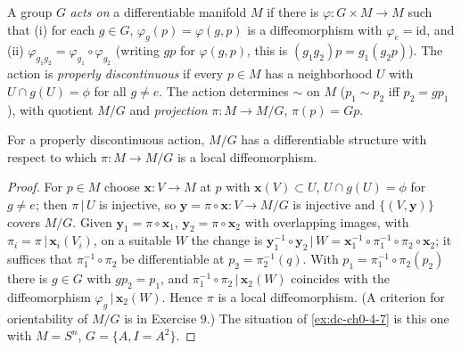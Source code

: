 \begin{example}
  \label{ex:dc-ch0-4-8}
  \notready
  A group $G$ \emph{acts on} a differentiable manifold $M$ if there is
  $\varphi:G\times M\to M$ such that (i) for each $g\in G$, $\varphi_g(p)=\varphi(g,p)$
  is a diffeomorphism with $\varphi_e=\mathrm{id}$, and (ii)
  $\varphi_{g_1 g_2}=\varphi_{g_1}\circ\varphi_{g_2}$ (writing $gp$ for $\varphi(g,p)$,
  this is $(g_1 g_2)p=g_1(g_2 p)$). The action is \emph{properly discontinuous} if every
  $p\in M$ has a neighborhood $U$ with $U\cap g(U)=\phi$ for all $g\neq e$. The
  action determines $\sim$ on $M$ ($p_1\sim p_2$ iff $p_2=gp_1$), with quotient
  $M/G$ and \emph{projection} $\pi:M\to M/G$, $\pi(p)=Gp$.
  
  For a properly discontinuous action, $M/G$ has a differentiable structure with
  respect to which $\pi:M\to M/G$ is a local diffeomorphism.
\end{example}
\begin{proof}
  For $p\in M$ choose $\mathbf{x}:V\to M$ at $p$ with $\mathbf{x}(V)\subset
  U$, $U\cap g(U)=\phi$ for $g\neq e$; then $\pi\,|\,U$ is injective, so
  $\mathbf{y}=\pi\circ\mathbf{x}:V\to M/G$ is injective and $\{(V,\mathbf{y})\}$
  covers $M/G$. Given $\mathbf{y}_1=\pi\circ\mathbf{x}_1$,
  $\mathbf{y}_2=\pi\circ\mathbf{x}_2$ with overlapping images, with $\pi_i=\pi\,|\,\mathbf{x}_i(V_i)$,
  on a suitable $W$ the change is
  $\mathbf{y}_1^{-1}\circ\mathbf{y}_2\,|\,W=\mathbf{x}_1^{-1}\circ\pi_1^{-1}\circ\pi_2\circ\mathbf{x}_2$;
  it suffices that $\pi_1^{-1}\circ\pi_2$ be differentiable at
  $p_2=\pi_2^{-1}(q)$. With $p_1=\pi_1^{-1}\circ\pi_2(p_2)$ there is $g\in G$ with
  $gp_2=p_1$, and $\pi_1^{-1}\circ\pi_2\,|\,\mathbf{x}_2(W)$ coincides with the
  diffeomorphism $\varphi_g\,|\,\mathbf{x}_2(W)$. Hence $\pi$ is a local
  diffeomorphism. (A criterion for orientability of $M/G$ is in Exercise 9.) The
  situation of \cref{ex:dc-ch0-4-7} is this one with $M=S^n$, $G=\{A,I=A^2\}$.
\end{proof}

